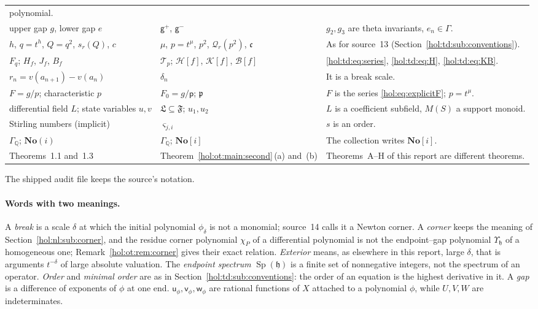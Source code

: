 \documentclass[11pt]{article}
\numberwithin{equation}{section}
\theoremstyle{definition}
\theoremstyle{remark}
\newcommand{\Q}{\mathbb Q}
\newcommand{\No}{\mathbf{No}}
\begin{document}
{\begin{longtable}{@{}>{\raggedright\arraybackslash}p{}
>{\raggedright\arraybackslash}p{}
>{\raggedright\arraybackslash}p{}@{}}
polynomial.\\
upper gap $g$, lower gap $e$ & $\mathsf g^+$, $\mathsf g^-$ & $g_2,g_3$ are
theta invariants, $e_n\in\Gamma$.\\
$h$, $q=t^h$, $Q=q^2$, $s_r(Q)$, $c$ & $\mu$, $p=t^\mu$, $p^2$,
$\mathcal Q_r(p^2)$, $\mathfrak c$ & As for source~13
(Section~\ref{hol:td:sub:conventions}).\\
$F_q$; $H_f$, $J_f$, $B_f$ & $\mathcal T_p$; $\mathcal H[f]$, $\mathcal K[f]$,
$\mathcal B[f]$ & \eqref{hol:td:eq:series}, \eqref{hol:td:eq:H},
\eqref{hol:td:eq:KB}.\\
$r_n=v(a_{n+1})-v(a_n)$ & $\delta_n$ & It is a break scale.\\
$F=g/p$; characteristic $p$ & $F_0=g/\mathsf p$; $\mathfrak p$ & $F$ is the
series \eqref{hol:eq:explicitF}; $p=t^\mu$.\\
differential field $L$; state variables $u,v$ & $\mathfrak L\subseteq\mathfrak
F$; $u_1,u_2$ & $L$ is a coefficient subfield, $M(S)$ a support monoid.\\
Stirling numbers (implicit) & $\varsigma_{j,i}$ & $s$ is an order.\\
$\Gamma_\Q$; $\No(i)$ & $\Gamma_\Q$; $\No[i]$ & The collection writes
$\No[i]$.\\
Theorems~1.1 and~1.3 & Theorem~\ref{hol:ot:main:second}\,(a) and~(b) &
Theorems~A--H of this report are different theorems.\\
\bottomrule
\end{longtable}}
The shipped audit file  keeps
the source's notation.

\paragraph{Words with two meanings.}
A \emph{break} is a scale $\delta$ at which the initial polynomial
$\phi_\delta$ is not a monomial; source~14 calls it a Newton corner. A
\emph{corner} keeps the meaning of Section~\ref{hol:nl:sub:corner}, and the
residue corner polynomial $\chi_P$ of a differential polynomial is not the
endpoint--gap polynomial $\Upsilon_{\mathfrak h}$ of a homogeneous one;
Remark~\ref{hol:ot:rem:corner} gives their exact relation. \emph{Exterior}
means, as elsewhere in this report, large $\delta$, that is arguments
$t^{-\delta}$ of large absolute valuation. The \emph{endpoint spectrum}
$\operatorname{Sp}(\mathfrak h)$ is a finite set of nonnegative integers, not
the spectrum of an operator. \emph{Order} and \emph{minimal order} are as in
Section~\ref{hol:td:sub:conventions}: the order of an equation is the highest
derivative in it. A \emph{gap} is a difference of exponents of $\phi$ at one
end. $\mathsf u_\phi,\mathsf v_\phi,\mathsf w_\phi$ are rational functions of
$X$ attached to a polynomial $\phi$, while $U,V,W$ are indeterminates.
\end{document}
